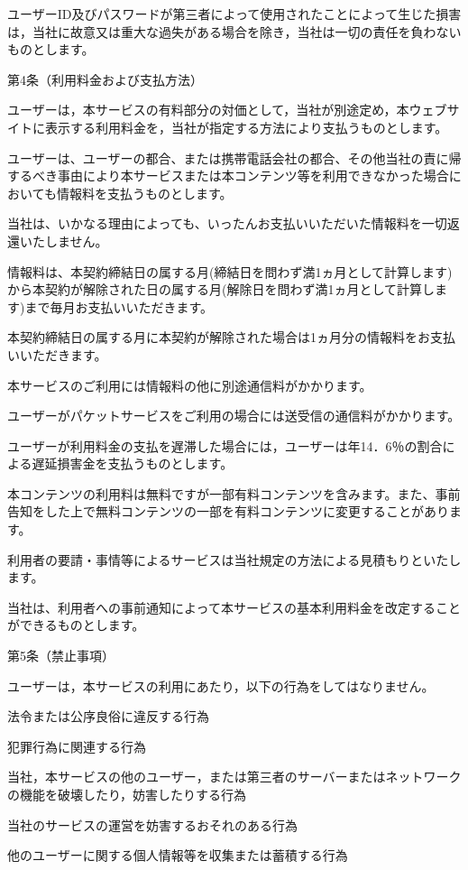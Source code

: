     ユーザーID及びパスワードが第三者によって使用されたことによって生じた損害は，当社に故意又は重大な過失がある場合を除き，当社は一切の責任を負わないものとします。

第4条（利用料金および支払方法）

    ユーザーは，本サービスの有料部分の対価として，当社が別途定め，本ウェブサイトに表示する利用料金を，当社が指定する方法により支払うものとします。

    ユーザーは、ユーザーの都合、または携帯電話会社の都合、その他当社の責に帰するべき事由により本サービスまたは本コンテンツ等を利用できなかった場合においても情報料を支払うものとします。

    当社は、いかなる理由によっても、いったんお支払いいただいた情報料を一切返還いたしません。

    情報料は、本契約締結日の属する月(締結日を問わず満1ヵ月として計算します)から本契約が解除された日の属する月(解除日を問わず満1ヵ月として計算します)まで毎月お支払いいただきます。

    本契約締結日の属する月に本契約が解除された場合は1ヵ月分の情報料をお支払いいただきます。

    本サービスのご利用には情報料の他に別途通信料がかかります。

    ユーザーがパケットサービスをご利用の場合には送受信の通信料がかかります。

    ユーザーが利用料金の支払を遅滞した場合には，ユーザーは年14．6％の割合による遅延損害金を支払うものとします。

    本コンテンツの利用料は無料ですが一部有料コンテンツを含みます。また、事前告知をした上で無料コンテンツの一部を有料コンテンツに変更することがあります。

    利用者の要請・事情等によるサービスは当社規定の方法による見積もりといたします。 

    当社は、利用者への事前通知によって本サービスの基本利用料金を改定することができるものとします。 

第5条（禁止事項）

ユーザーは，本サービスの利用にあたり，以下の行為をしてはなりません。

    法令または公序良俗に違反する行為

    犯罪行為に関連する行為

    当社，本サービスの他のユーザー，または第三者のサーバーまたはネットワークの機能を破壊したり，妨害したりする行為

    当社のサービスの運営を妨害するおそれのある行為

    他のユーザーに関する個人情報等を収集または蓄積する行為

